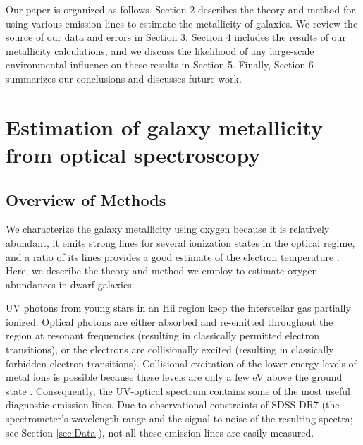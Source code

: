 Our paper is organized as follows.  Section 2 describes the theory and method 
for using various emission lines to estimate the metallicity of galaxies.  We 
review the source of our data and errors in Section 3.   Section 4 includes the 
results of our metallicity calculations, and we discuss the likelihood of any 
large-scale environmental influence on these results in Section 5.  Finally, 
Section 6 summarizes our conclusions and discusses future work.



\section[Theory]{Estimation of galaxy metallicity from optical spectroscopy}
\label{sec:Theory_P1}

\subsection{Overview of Methods}

We characterize the galaxy metallicity using oxygen because it is relatively 
abundant, it emits strong lines for several ionization states in the optical 
regime, and a ratio of its lines provides a good estimate of the electron 
temperature \citep{Kewley02}.  Here, we describe the theory and method we employ 
to estimate oxygen abundances in dwarf galaxies.

UV photons from young stars in an H{\sc ii} region keep the interstellar gas 
partially ionized.  Optical photons are either absorbed and re-emitted 
throughout the region at resonant frequencies (resulting in classically 
permitted electron transitions), or the electrons are collisionally excited 
(resulting in classically forbidden electron transitions).  Collisional 
excitation of the lower energy levels of metal ions is possible because these 
levels are only a few eV above the ground state \citep{DeRobertis87}.  
Consequently, the UV-optical spectrum contains some of the most useful 
diagnostic emission lines.  Due to observational constraints of SDSS DR7 (the 
spectrometer's wavelength range and the signal-to-noise of the resulting 
spectra; see Section \ref{sec:Data}), not all these emission lines are easily 
measured.

